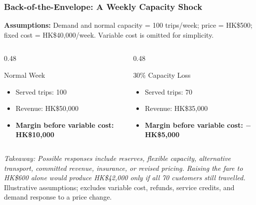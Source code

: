\documentclass{beamer}
\begin{document}
\begin{frame}[t,shrink=10]
\frametitle{Back-of-the-Envelope: A Weekly Capacity Shock}
\textbf{Assumptions:} Demand and normal capacity = 100 trips/week; price = HK\$500; fixed cost = HK\$40,000/week. Variable cost is omitted for simplicity.
\begin{columns}[T]
\begin{column}{0.48\textwidth}\begin{block}{Normal Week}
\begin{itemize}
\item Served trips: 100
\item Revenue: HK\$50,000
\item \textbf{Margin before variable cost: HK\$10,000}
\end{itemize}\end{block}\end{column}
\begin{column}{0.48\textwidth}\begin{block}{30\% Capacity Loss}
\begin{itemize}
\item Served trips: 70
\item Revenue: HK\$35,000
\item \textbf{Margin before variable cost: $-$HK\$5,000}
\end{itemize}\end{block}\end{column}
\end{columns}
\textit{Takeaway: Possible responses include reserves, flexible capacity, alternative transport, committed revenue, insurance, or revised pricing. Raising the fare to HK\$600 alone would produce HK\$42,000 only if all 70 customers still travelled.}
\vfill{\tiny Illustrative assumptions; excludes variable cost, refunds, service credits, and demand response to a price change.}
\end{frame}
\end{document}
